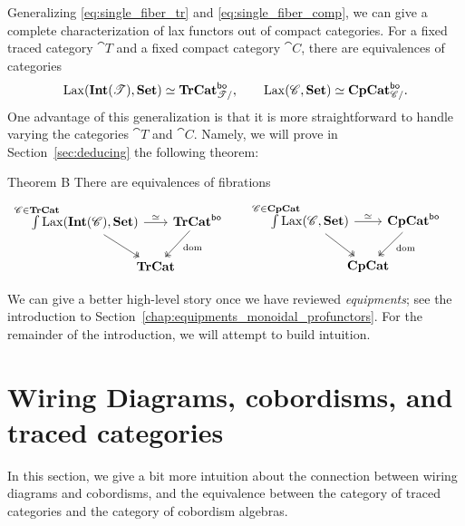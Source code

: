 \documentclass[11pt,oneside,article]{memoir}
\begin{document}
Generalizing \eqref{eq:single_fiber_tr} and \eqref{eq:single_fiber_comp}, we can give a complete
characterization of lax functors out of compact categories. For a fixed traced category $\cat{T}$
and a fixed compact category $\cat{C}$, there are equivalences of categories
\begin{equation}\label{eqn:lax_compcat_bo}
   \operatorname{Lax}(\mathbf{Int}(\mathscr{T}),\mathbf{Set})\simeq\mathbf{TrCat}^{\mathsf{bo}}_{\mathscr{T}/},
   \qquad
   \operatorname{Lax}(\mathscr{C},\mathbf{Set})\simeq\mathbf{CpCat}^{\mathsf{bo}}_{\mathscr{C}/}.
\end{equation}
One advantage of this generalization is that it is more straightforward to handle varying the
categories $\cat{T}$ and $\cat{C}$. Namely, we will prove in Section~\ref{sec:deducing} the
following theorem:

\begin{named}{Theorem B}\label{thm:TheoremB_statement}
   There are equivalences of fibrations
   \begin{equation*}
      \begin{tikzcd}[column sep=-1em]
         \int\limits^{\mathclap{\cat{C}\in\TrCat}} \Lax(\Int(\cat{C}),\Set)
               \ar[rr,"\equiv"] \ar[dr,two heads]
            && \TrCat^{\bo} \ar[dl,two heads,"\dom" pos=.4] \\
         & \TrCat &
      \end{tikzcd}
      \qquad\quad
      \begin{tikzcd}[column sep=-1em]
         \int\limits^{\mathclap{\cat{C}\in\CompCat}} \Lax(\cat{C},\Set)
               \ar[rr,"\equiv"] \ar[dr,two heads]
            && \CompCat^{\bo} \ar[dl,two heads,"\dom" pos=.4] \\
         & \CompCat &
      \end{tikzcd}
   \end{equation*}
\end{named}

We can give a better high-level story once we have reviewed \emph{equipments}; see the introduction
to Section~\ref{chap:equipments_monoidal_profunctors}. For the remainder of the introduction, we
will attempt to build intuition.

\section{Wiring Diagrams, cobordisms, and traced categories}

In this section, we give a bit more intuition about the connection between wiring diagrams and
cobordisms, and the equivalence between the category of traced categories and the category of
cobordism algebras.
\end{document}
